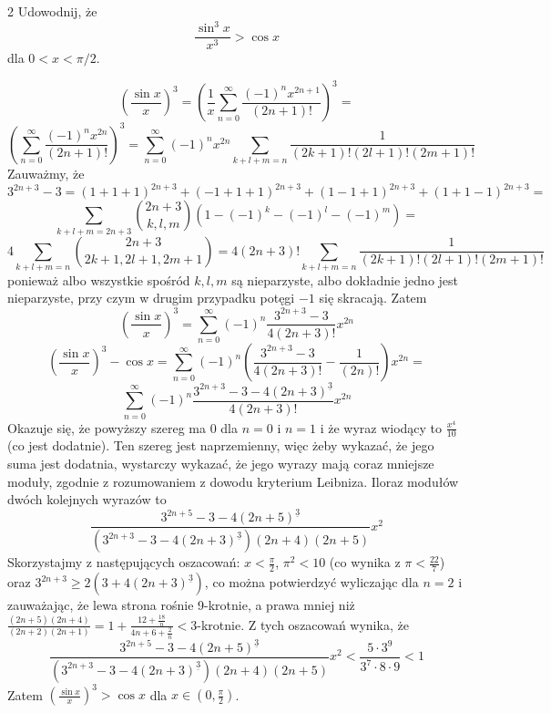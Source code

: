 \documentclass{../note}
\begin{document}
\begin{zadanie}{2}
Udowodnij, że
\[ \frac{\sin^3 x}{x^3} > \cos x \]
dla $0 < x < \pi/2$.
\end{zadanie}
\begin{rozwiazanie}
\[\left(\frac{\sin x}{x}\right)^3 = \left(\frac1x\sum_{n=0}^{\infty} \frac{(-1)^nx^{2n+1}}{(2n+1)!}\right)^3 =\]\[ \left(\sum_{n=0}^{\infty} \frac{(-1)^nx^{2n}}{(2n+1)!}\right)^3 = \sum_{n=0}^{\infty}(-1)^nx^{2n}\sum_{k+l+m=n} \frac{1}{(2k+1)!(2l+1)!(2m+1)!}\]
Zauważmy, że
\[3^{2n+3} - 3 = (1+1+1)^{2n+3} + (-1+1+1)^{2n+3} + (1-1+1)^{2n+3} + (1+1-1)^{2n+3} =\]
\[\sum_{k+l+m=2n+3}\binom{2n+3}{k, l, m} \left(1 - (-1)^k - (-1)^l - (-1)^m\right) =\]\[ 4\sum_{k+l+m=n} \binom{2n+3}{2k + 1, 2l + 1, 2m + 1} = 4(2n+3)!\sum_{k+l+m=n} \frac{1}{(2k + 1)!(2l + 1)!(2m + 1)!}\]
ponieważ albo wszystkie spośród $k, l, m$ są nieparzyste, albo dokładnie jedno jest nieparzyste, przy czym w drugim przypadku potęgi $-1$ się skracają. Zatem
\[\left(\frac{\sin x}{x}\right)^3 = \sum_{n=0}^{\infty}(-1)^n\frac{3^{2n+3} - 3}{4(2n+3)!} x^{2n}\]
\[\left(\frac{\sin x}{x}\right)^3 - \cos x = \sum_{n=0}^{\infty}(-1)^n\left(\frac{3^{2n+3} - 3}{4(2n+3)!} - \frac{1}{(2n)!}\right) x^{2n} =\]\[ \sum_{n=0}^{\infty}(-1)^n\frac{3^{2n+3} - 3 - 4(2n+3)^{\underline{3}}}{4(2n+3)!} x^{2n}\]
Okazuje się, że powyższy szereg ma 0 dla $n=0$ i $n = 1$ i że wyraz wiodący to $\frac{x^4}{10}$ (co jest dodatnie). Ten szereg jest naprzemienny, więc żeby wykazać, że jego suma jest dodatnia, wystarczy wykazać, że jego wyrazy mają coraz mniejsze moduły, zgodnie z rozumowaniem z dowodu kryterium Leibniza. Iloraz modułów dwóch kolejnych wyrazów to
\[\frac{3^{2n+5} - 3 - 4(2n+5)^{\underline{3}}}{\left(3^{2n+3} - 3 - 4(2n+3)^{\underline{3}}\right)(2n+4)(2n+5)} x^2\]
Skorzystajmy z następujących oszacowań: $x < \frac{\pi}{2}$, $\pi^2 < 10$ (co wynika z $\pi < \frac{22}{7}$) oraz $3^{2n+3} \geq 2\left(3 + 4(2n+3)^{\underline{3}}\right)$, co można potwierdzyć wyliczając dla $n = 2$ i zauważając, że lewa strona rośnie 9-krotnie, a prawa mniej niż $\frac{(2n+5)(2n+4)}{(2n+2)(2n+1)} = 1 + \frac{12 + \frac{18}{n}}{4n + 6 + \frac2n} < 3$-krotnie. Z tych oszacowań wynika, że
\[\frac{3^{2n+5} - 3 - 4(2n+5)^{\underline{3}}}{\left(3^{2n+3} - 3 - 4(2n+3)^{\underline{3}}\right)(2n+4)(2n+5)} x^2 < \frac{5\cdot 3^9}{3^7\cdot 8\cdot9} < 1\]
Zatem $\left(\frac{\sin x}{x}\right)^3 > \cos x$ dla $x \in (0, \frac{\pi}{2})$.
\end{rozwiazanie}
\end{document}
